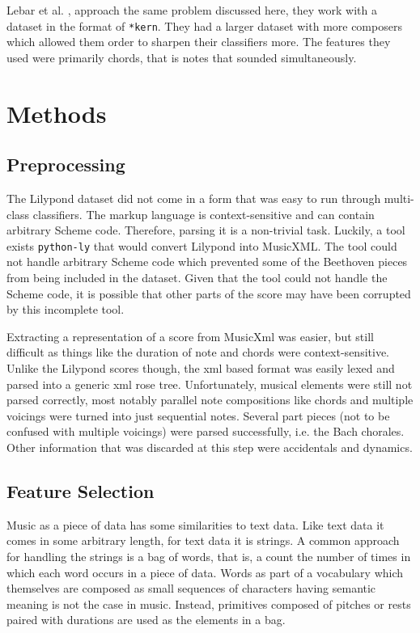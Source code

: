 \documentclass[10pt]{IEEEtran}
\begin{document}
Lebar et al. \cite{lebar2008}, approach the same problem discussed here, they
work with a dataset in the format of {\tt **kern}. They had a larger dataset
with more composers which allowed them order to sharpen their classifiers more.
The features they used were primarily chords, that is notes that sounded
simultaneously.

\section{Methods}

\subsection{Preprocessing}

The Lilypond dataset did not come in a form that was easy to run through
multi-class classifiers. The markup language is context-sensitive and can
contain arbitrary Scheme code. Therefore, parsing it is a non-trivial task.
Luckily, a tool exists {\tt python-ly} that would convert Lilypond into
MusicXML. The tool could not handle arbitrary Scheme code which prevented some
of the Beethoven pieces from being included in the dataset. Given that the tool
could not handle the Scheme code, it is possible that other parts of the score
may have been corrupted by this incomplete tool.

Extracting a representation of a score from MusicXml was easier, but still
difficult as things like the duration of note and chords were context-sensitive.
Unlike the Lilypond scores though, the xml based format was easily lexed and
parsed into a generic xml rose tree. Unfortunately, musical elements were still
not parsed correctly, most notably parallel note compositions like chords and
multiple voicings were turned into just sequential notes. Several part pieces
(not to be confused with multiple voicings) were parsed successfully, i.e. the
Bach chorales. Other information that was discarded at this step were
accidentals and dynamics.

\subsection{Feature Selection}

Music as a piece of data has some similarities to text data. Like text data
it comes in some arbitrary length, for text data it is strings. A common
approach for handling the strings is a bag of words, that is, a count the number
of times in which each word occurs in a piece of data. Words as part of a
vocabulary which themselves are composed as small sequences of characters having
semantic meaning is not the case in music. Instead, primitives composed of
pitches or rests paired with durations are used as the elements in a bag.
\end{document}
